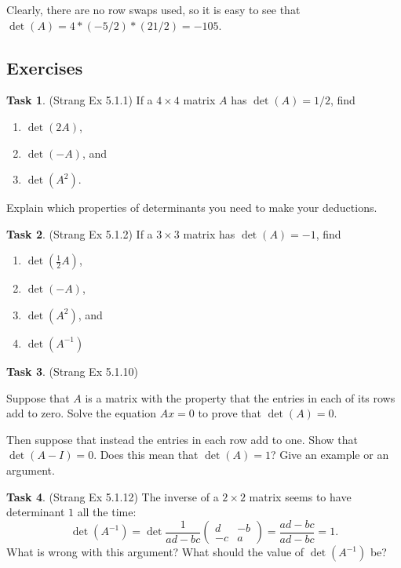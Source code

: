 \documentclass[10pt,]{book}
\theoremstyle{plain}
\theoremstyle{definition}
\numberwithin{equation}{section}
\newtheorem{task}{Task}[chapter]
\begin{document}
      Clearly, there are no row swaps used, so it is easy to see that
      \(\det(A) = 4*(-5/2)*(21/2) = -105\).
\typeout{************************************************}
\typeout{************************************************}
\subsection[Exercises]{Exercises}\label{subsection-119}
\begin{task}
\label{task-145}
(Strang Ex 5.1.1)
        If a \(4 \times 4\) matrix \(A\) has \(\det(A) = 1/2\), find
        \begin{enumerate}
\item{}\(\det(2A)\),\item{}\(\det(-A)\), and\item{}\(\det(A^2)\).\end{enumerate}

        Explain which properties of determinants you need to make your deductions.
      \end{task}
\begin{task}
\label{task-146}
(Strang Ex 5.1.2)
        If a \(3 \times 3\) matrix has \(\det(A) = -1\), find
        \begin{enumerate}
\item{}\(\det(\frac{1}{2}A)\),\item{}\(\det(-A)\),\item{}\(\det(A^2)\), and \item{}\(\det(A^{-1})\)\end{enumerate}
\end{task}
\begin{task}
\label{task-147}
(Strang Ex 5.1.10)
        
          Suppose that \(A\) is a matrix with the property that the entries in
          each of its rows add to zero. Solve the equation \(Ax = 0\) to prove
          that \(\det(A)=0\).
\par

          Then suppose that instead the entries in each row add to one. Show that
          \(\det(A-I)=0\). Does this mean that \(\det(A) = 1\)? Give an example
          or an argument.
\end{task}
\begin{task}
\label{task-148}
(Strang Ex 5.1.12)
        The inverse of a \(2 \times 2\) matrix seems to have determinant \(1\)
        all the time:
        \[
          \det(A^{-1}) = \det \frac{1}{ad-bc}\begin{pmatrix} d & -b \\
          -c & a \end{pmatrix} = \frac{ad-bc}{ad-bc} = 1.
        \]
        What is wrong with this argument? What should the value of \(\det(A^{-1})\)
        be?
      \end{task}
\end{document}
